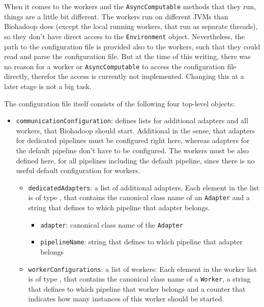   When it comes to the workers and the \texttt{AsyncComputable} methods that they run, things are a little bit different. The workers run on different JVMs than Biohadoop does (except the local running workers, that run as separate threads), so they don't have direct access to the \texttt{Environment} object. Nevertheless, the path to the configuration file is provided also to the workers, such that they could read and parse the configuration file. But at the time of this writing, there was no reason for a worker or \texttt{AsyncComputable} to access the configuration file directly, therefor the access is currently not implemented. Changing this at a later stage is not a big task.
  
  The configuration file itself consists of the following four top-level objects:
  \begin{itemize}
    \item \texttt{communicationConfiguration}: defines lists for additional adapters and all workers, that Biohadoop should start. Additional in the sense, that adapters for dedicated pipelines must be configured right here, whereas adapters for the default pipeline don't have to be configured. The workers must be also defined here, for all pipelines including the default pipeline, since there is no useful default configuration for workers. 
    \begin{itemize}
       \item \texttt{dedicatedAdapters}: a list of additional adapters. Each element in the list is of type , that contains the canonical class name of an \texttt{Adapter} and a string that defines to which pipeline that adapter belongs.
       \begin{itemize}
         \item \texttt{adapter}: canonical class name of the \texttt{Adapter}
         \item \texttt{pipelineName}: string that defines to which pipeline that adapter belongs
       \end{itemize}
       \item \texttt{workerConfigurations}: a list of workers: Each element in the worker list is of type , that contains the canonical class name of a \texttt{Worker}, a string that defines to which pipeline that worker belongs and a counter that indicates how many instances of this worker should be started.
       \begin{itemize}

\end{itemize}
\end{itemize}
\end{itemize}
